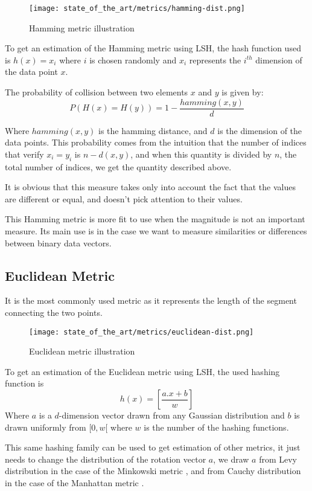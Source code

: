 \begin{figure}[h]
    \centering
    \texttt{[image: state\_of\_the\_art/metrics/hamming-dist.png]}
    \caption{Hamming metric illustration}
    \label{fig:hamming_metric}
\end{figure}

To get an estimation of the Hamming metric using LSH, the hash function used is
$h(x) = x_i$ where $i$ is chosen randomly and $x_i$ represents the $i^{th}$
dimension of the data point $x$.

The probability of collision between two elements $x$ and $y$ is given by:
$$
    P(H(x) = H(y) ) = 1 - \frac{hamming(x,y)}{d}
$$

Where $hamming(x, y)$ is the hamming distance, and $d$ is the dimension of the data
points. This probability comes from the intuition that the number of indices
that verify $x_i = y_i$ is $n - d(x, y)$, and when this quantity is divided by
$n$, the total number of indices, we get the quantity described above.

It is obvious that this measure takes only into account the fact that the
values are different or equal, and doesn't pick attention to their values.

This Hamming metric is more fit to use when the magnitude is not an important
measure. Its main use is in the case we want to measure similarities or
differences between binary data vectors.

\subsection{Euclidean Metric}
\label{subsect:euclidean_metric}
It is the most commonly used metric as it represents the length of the segment
connecting the two points.
\begin{figure}[h]
    \centering
    \texttt{[image: state\_of\_the\_art/metrics/euclidean-dist.png]}
    \caption{Euclidean metric illustration}
    \label{fig:euclidean_metric}
\end{figure}

To get an estimation of the Euclidean metric using LSH, the used hashing
function is
$$
    h(x) = [\frac{a. x + b}{w}]
$$
Where $a$ is a $d$-dimension vector drawn from any Gaussian distribution and $b$
is drawn uniformly from $[0, w[$ where $w$ is the number of the hashing
functions.

This same hashing family can be used to get estimation of other metrics, it just
needs to change the distribution of the rotation vector $a$, we draw $a$ from
Levy distribution in the case of the Minkowski metric \citep{minkowski_2019},
and from Cauchy distribution in the case of the Manhattan metric
\citep{manhattan_2018}.


